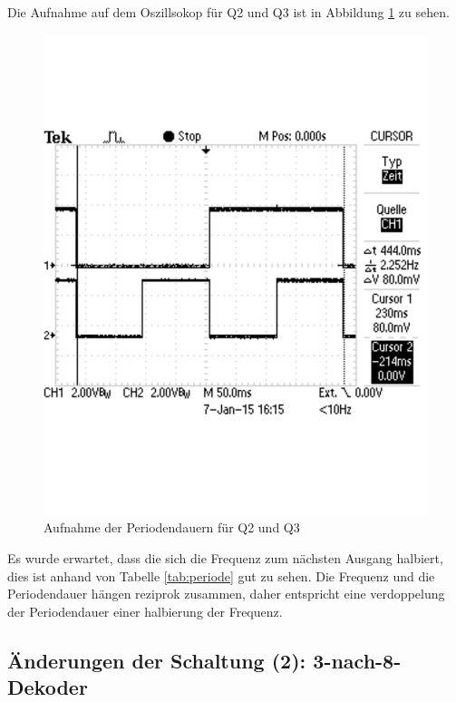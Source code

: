 \documentclass[12pt,a4paper]{article}
\begin{document}
Die Aufnahme auf dem Oszillsokop für Q2 und Q3 ist in Abbildung \ref{fig:periode_2} zu sehen.

\begin{figure}[H] 
  \centering 	
    \includegraphics[trim = 0mm 50mm 0mm 50mm, clip, scale = 0.4]{TEK0013.pdf}
  	\caption[Aufnahme der Periodendauern für Q2 und Q3]{Aufnahme der Periodendauern für Q2 und Q3}
  \label{fig:periode_2}
\end{figure}

Es wurde erwartet, dass die sich die Frequenz zum nächsten Ausgang halbiert, dies ist anhand von Tabelle \ref{tab:periode} gut zu sehen. Die Frequenz und die Periodendauer hängen reziprok zusammen, daher entspricht eine verdoppelung der Periodendauer einer halbierung der Frequenz.

\subsection{Änderungen der Schaltung (2): 3-nach-8-Dekoder}
\end{document}
